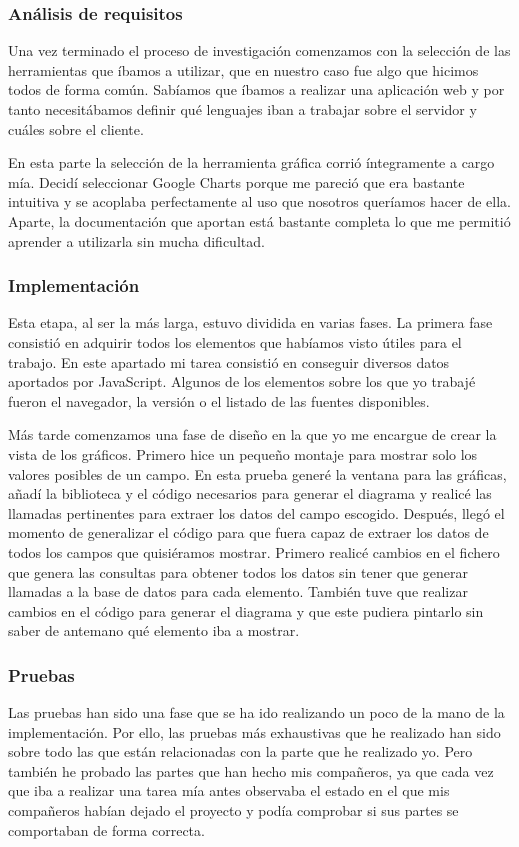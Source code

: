 \subsubsection{Análisis de requisitos}
Una vez terminado el proceso de investigación comenzamos con la selección de las herramientas que íbamos a utilizar, que en nuestro caso fue algo que hicimos todos de forma común. Sabíamos que íbamos a realizar una aplicación web y por tanto necesitábamos definir qué lenguajes iban a trabajar sobre el servidor y cuáles sobre el cliente. \par
En esta parte la selección de la herramienta gráfica corrió íntegramente a cargo mía. Decidí seleccionar Google Charts porque me pareció que era bastante intuitiva y se acoplaba perfectamente al uso que nosotros queríamos hacer de ella. Aparte, la documentación que aportan está bastante completa lo que me permitió aprender a utilizarla sin mucha dificultad.

\subsubsection{Implementación}
Esta etapa, al ser la más larga, estuvo dividida en varias fases. La primera fase consistió en adquirir todos los elementos que habíamos visto útiles para el trabajo. En este apartado mi tarea consistió en conseguir diversos datos aportados por JavaScript. Algunos de los elementos sobre los que yo trabajé fueron el navegador, la versión o el listado de las fuentes disponibles. \par
Más tarde comenzamos una fase de diseño en la que yo me encargue de crear la vista de los gráficos. Primero hice un pequeño montaje para mostrar solo los valores posibles de un campo. En esta prueba generé la ventana para las gráficas, añadí la biblioteca y el código necesarios para generar el diagrama y realicé las llamadas pertinentes para extraer los datos del campo escogido. Después, llegó el momento de generalizar el código para que fuera capaz de extraer los datos de todos los campos que quisiéramos mostrar. Primero realicé cambios en el fichero que genera las consultas para obtener todos los datos sin tener que generar llamadas a la base de datos para cada elemento. También tuve que realizar cambios en el código para generar el diagrama y que este pudiera pintarlo sin saber de antemano qué elemento iba a mostrar.

\subsubsection{Pruebas}
Las pruebas han sido una fase que se ha ido realizando un poco de la mano de la implementación. Por ello, las pruebas más exhaustivas que he realizado han sido sobre todo las que están relacionadas con la parte que he realizado yo. Pero también he probado las partes que han hecho mis compañeros, ya que cada vez que iba a realizar una tarea mía antes observaba el estado en el que mis compañeros habían dejado el proyecto y podía comprobar si sus partes se comportaban de forma correcta.

